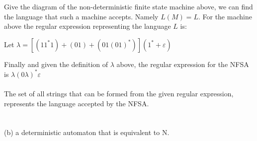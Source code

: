\documentclass{report}
\newcommand{\me}[1]{
\begin{math}
#1
\end{math}
}
\begin{document}
Give the diagram of the non-deterministic finite state machine above, we can find the language that such a machine accepts. Namely \me{L(M) = L. } For the machine above the  regular expression representing the language \me{L} is:\\ \newline

Let \me{\lambda = [(11^*1)  + (01) + (01(01)^*)] (1^* +\varepsilon)} 
Finally and given the definition of $\lambda$ above, the regular expression for the NFSA is \me{\lambda(0\lambda)^*\varepsilon} \\ \\The set of all strings that can be formed from the given regular expression, represents the language accepted by the NFSA. \\ \\ \\

(b) a deterministic automaton that is equivalent to N.
\end{document}
